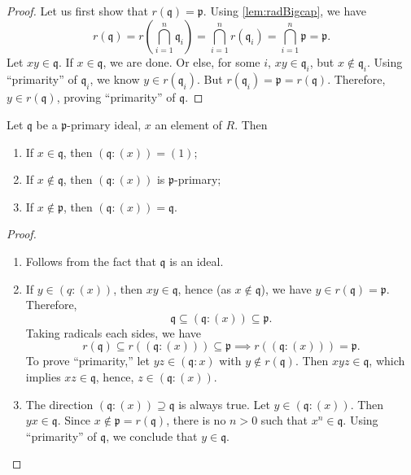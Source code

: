 \begin{proof}
 Let us first show that \(r( \mathfrak{q}) = \mathfrak{p}\). Using \autoref{lem:radBigcap}, we have
    \[
    r(\mathfrak{q}) = r\left(\bigcap_{i=1}^n \mathfrak{q}_i \right) = \bigcap_{i=1}^n r(\mathfrak{q}_i) = \bigcap_{i=1}^n \mathfrak{p} = \mathfrak{p}.
    \]
  Let \(xy \in \mathfrak{q} \). If \( x \in \mathfrak{q} \), we are done. Or else, for some \( i \),  \( xy \in \mathfrak{q}_i \), but \( x \not\in \mathfrak{q}_i \). Using ``primarity'' of \( \mathfrak{q}_i \), we know \( y \in r(\mathfrak{q}_i) \). But \( r(\mathfrak{q}_i) = \mathfrak{p} = r(\mathfrak{q})\). Therefore, \( y \in r(\mathfrak{q}) \), proving ``primarity'' of \( \mathfrak{q} \).
\end{proof}
\begin{lemma}\label{lem:primaryLemma2}
    Let \( \mathfrak{q} \) be a \( \mathfrak{p} \)-primary ideal, \( x \) an element of \( R \). Then
    \begin{enumerate}[label=\roman*)]
        \item If \( x \in \mathfrak{q} \), then \( (\mathfrak{q}: (x)) = (1) \);
        \item If \( x \not\in \mathfrak{q} \), then \( (\mathfrak{q}: (x)) \) is \( \mathfrak{p} \)-primary;
        \item If \( x \not\in \mathfrak{p} \), then \( (\mathfrak{q}: (x)) = \mathfrak{q} \).
    \end{enumerate}
\end{lemma}
\begin{proof}
    \begin{enumerate}[label=\roman*)]
        \item Follows from the fact that \( \mathfrak{q} \) is an ideal.
        \item If \( y \in (q: (x)) \), then  \( xy \in \mathfrak{q} \), hence (as \( x \not\in \mathfrak{q} \)), we have \( y \in r(\mathfrak{q}) = \mathfrak{p} \). Therefore, 
            \[
            \mathfrak{q} \subseteq (\mathfrak{q}:(x)) \subseteq \mathfrak{p}.
            \]
            Taking radicals each sides, we have
            \[
            r(\mathfrak{q}) \subseteq r((\mathfrak{q}: (x))) \subseteq \mathfrak{p} \implies r((\mathfrak{q}:(x))) = \mathfrak{p}.
            \]
            To prove ``primarity,'' let \( yz \in (\mathfrak{q}: x)\) with \( y \not\in r(\mathfrak{q}) \). Then \( xyz \in \mathfrak{q} \), which implies \( xz \in \mathfrak{q} \), hence, \( z \in (\mathfrak{q}: (x))\).
        \item The direction \( (\mathfrak{q}: (x)) \supseteq \mathfrak{q} \) is always true. Let \( y \in (\mathfrak{q}:(x)) \). Then \( yx \in \mathfrak{q} \). Since \( x \not\in \mathfrak{p} = r(\mathfrak{q})\), there is no \( n > 0 \) such that  \( x^n \in \mathfrak{q}\). Using ``primarity'' of  \( \mathfrak{q} \), we conclude that \( y \in \mathfrak{q} \).  
    \end{enumerate}
\end{proof}
